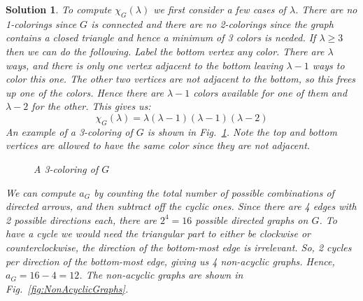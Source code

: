\documentclass{article}
\theoremstyle{normal}
\theoremstyle{thmit}
\newtheorem*{solution}{Solution}
\begin{document}
    \begin{solution}
        To compute $\chi_{G}(\lambda)$ we first consider a few cases of $\lambda$. There
        are no 1-colorings since $G$ is connected and there are no 2-colorings since
        the graph contains a closed triangle and hence a minimum of 3 colors is needed.
        If $\lambda\geq{3}$ then we can do the following. Label the bottom vertex any
        color. There are $\lambda$ ways, and there is only one vertex adjacent to the
        bottom leaving $\lambda-1$ ways to color this one. The other two vertices are
        not adjacent to the bottom, so this frees up one of the colors. Hence there are
        $\lambda-1$ colors available for one of them and $\lambda-2$ for the other. This
        gives us:
        \begin{equation}
            \chi_{G}(\lambda)=\lambda(\lambda-1)(\lambda-1)(\lambda-2)
        \end{equation}
        An example of a 3-coloring of $G$ is shown in Fig.~\ref{fig:ThreeColoring}.
        Note the top and bottom vertices are allowed to have the same color since they
        are not adjacent.
            \begin{figure}[H]
                \centering
                \caption{A 3-coloring of $G$}
                \label{fig:ThreeColoring}
            \end{figure}
        We can compute $a_{G}$ by counting the total number of possible combinations of
        directed arrows, and then subtract off the cyclic ones. Since there are 4 edges
        with 2 possible directions each, there are $2^{4}=16$ possible directed graphs on
        $G$. To have a cycle we would need the triangular part to either be clockwise or
        counterclockwise, the direction of the bottom-most edge is irrelevant. So, 2
        cycles per direction of the bottom-most edge, giving us 4 non-acyclic graphs.
        Hence, $a_{G}=16-4=12$. The non-acyclic graphs are shown in
        Fig.~\ref{fig:NonAcyclicGraphs}.
    \end{solution}
\end{document}
